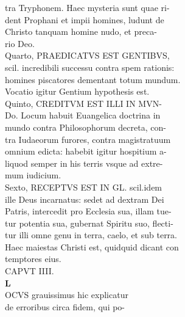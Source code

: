 \documentclass{article}
\begin{document}
\begin{pages}
                tra Tryphonem. Haec mysteria sunt quae ri- \\
                dent Prophani et impii homines, ludunt de \\
                Christo tanquam homine nudo, et preca- \\
                rio Deo. \\
                Quarto, PRAEDICATVS EST GENTIBVS, \\
                scil. incredibili successu contra spem rationis: \\
                homines piscatores dementant totum mundum. \\
                Vocatio igitur Gentium hypothesis est. \\
                Quinto, CREDITVM EST ILLI IN MVN- \\
                Do. Locum habuit Euangelica doctrina in \\
                mundo contra Philosophorum decreta, con- \\
                tra Iudaeorum furores, contra magistratuum \\
                omnium edicta: habebit igitur hospitium a- \\
                liquod semper in his terris vsque ad extre- \\
                mum iudicium. \\
                Sexto, RECEPTVS EST IN GL. scil.idem \\
                ille Deus incarnatus: sedet ad dextram Dei \\
                Patris, intercedit pro Ecclesia sua, illam tue- \\
                tur potentia sua, gubernat Spiritu suo, flecti- \\
                tur illi omne genu in terra, caelo, et sub terra. \\
                Haec maiestas Christi est, quidquid dicant con \\
                temptores eius. \\
                CAPVT IIII. \\
                \textbf{L \\
                }OCVS grauissimus hic explicatur \\
                de erroribus circa fidem, qui po- \\

\end{pages}
\end{document}
